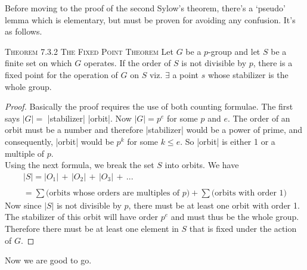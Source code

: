 \documentclass[12pt]{article}
\begin{document}
Before moving to the proof of the second Sylow's theorem, there's a `pseudo' lemma which is elementary, but must be proven for avoiding any confusion. It's as follows.
\par
\textsc {{\small Theorem 7.3.2} The Fixed Point Theorem } Let $G$ be a $p$-group and let $S$ be a finite set on which $G$ operates. If the order of $S$ is not divisible by $p$, there is a fixed point for the operation of $G$ on $S$ viz. $\exists$ a point $s$ whose stabilizer is the whole group.
\begin{proof}
Basically the proof requires the use of both counting formulae. The first says $|G|=$ |stabilizer| |orbit|. Now $|G|=p^{e}$ for some $p$ and $e$. The order of an orbit must be a number and therefore |stabilizer| would be a power of prime, and consequently, |orbit| would be $p^{k}$ for some $k\leq e$. So |orbit| is either 1 or a multiple of $p$.\\
Using the next formula, we break the set $S$ into orbits. We have
\begin{equation*}
\begin{array}{c}
|S|=|O_{1}|\,+\,|O_{2}|\,+\,|O_{3}|\,+\,...\\
\\
=\sum{\text{(orbits whose orders are multiples of }p)} + \sum{\text{(orbits with order 1)}}
\end{array}
\end{equation*}
Now since $|S|$ is not divisible by $p$, there must be at least one orbit with order 1. The stabilizer of this orbit will have order $p^{e}$ and must thus be the whole group. Therefore there must be at least one element in $S$ that is fixed under the action of $G$.
\end{proof}
Now we are good to go.
\end{document}
